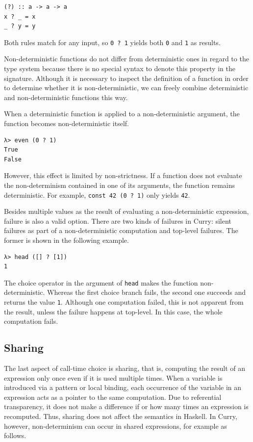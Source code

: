 \documentclass[a4paper, 11pt, fleqn, twoside, abstract=on]{scrreprt}
\newcommand{\hinl}[1]{\texttt{#1}}
\begin{document}
\begin{verbatim}
(?) :: a -> a -> a
x ? _ = x
_ ? y = y
\end{verbatim}
\noindent
Both rules match for any input, so \hinl{0 ? 1} yields both \hinl{0} and \hinl{1} as results.

Non-deterministic functions do not differ from deterministic ones in regard to the type system because there is no special syntax to denote this property in the signature.
Although it is necessary to inspect the definition of a function in order to determine whether it is non-deterministic, we can freely combine deterministic and non-deterministic functions this way.

When a deterministic function is applied to a non-deterministic argument, the function becomes non-deterministic itself.

\begin{verbatim}
λ> even (0 ? 1)
True
False
\end{verbatim}
\noindent
However, this effect is limited by non-strictness.
If a function does not evaluate the non-determinism contained in one of its arguments, the function remains deterministic.
For example, \hinl{const 42 (0 ? 1)} only yields \hinl{42}.

Besides multiple values as the result of evaluating a non-deterministic expression, failure is also a valid option.
There are two kinds of failures in Curry: silent failures as part of a non-deterministic computation and top-level failures.
The former is shown in the following example.

\begin{verbatim}
λ> head ([] ? [1])
1
\end{verbatim}
\noindent
The choice operator in the argument of \hinl{head} makes the function non-deterministic.
Whereas the first choice branch fails, the second one succeeds and returns the value \hinl{1}.
Although one computation failed, this is not apparent from the result, unless the failure happens at top-level.
In this case, the whole computation fails.

\subsection{Sharing}
The last aspect of call-time choice is sharing, that is, computing the result of an expression only once even if it is used multiple times.
When a variable is introduced via a pattern or local binding, each occurrence of the variable in an expression acts as a pointer to the same computation.
Due to referential transparency, it does not make a difference if or how many times an expression is recomputed.
Thus, sharing does not affect the semantics in Haskell.
In Curry, however, non-determinism can occur in shared expressions, for example as follows.
\end{document}

